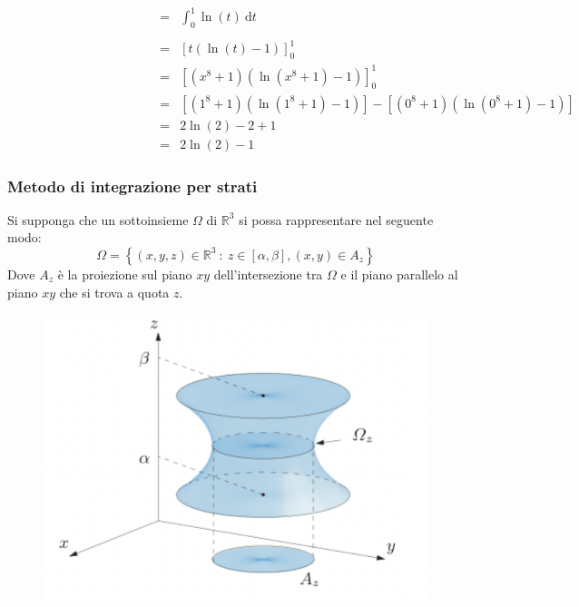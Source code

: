 \documentclass[a4paper]{article}
\begin{document}
	\begin{equation*}
		\begin{array}{rcl}
			\phantom{\displaystyle\iint\limits_{D} 16x^{9}y \cdot \dfrac{1}{x^{2}y^{2} + 1} \:\mathrm{d}x\:\mathrm{d}y}
			&=&
			\displaystyle\int_{0}^{1} \ln\left(t\right) \:\mathrm{d}t \\ [1em]
			&=&
			\left[t\left(\ln\left(t\right) - 1\right)\right]_{0}^{1} \\ [1em]
			&=&
			\left[\left(x^{8}+1\right)\left(\ln\left(x^{8}+1\right) - 1\right)\right]_{0}^{1} \\ [1em]
			&=&
			\left[\left(1^{8}+1\right)\left(\ln\left(1^{8}+1\right) - 1\right)\right] - \left[\left(0^{8}+1\right)\left(\ln\left(0^{8}+1\right) - 1\right)\right] \\ [1em]
			&=& 2 \ln\left(2\right) - 2 + 1 \\ [.5em]
			&=& 2 \ln\left(2\right) - 1
		\end{array}
	\end{equation*}

	\newpage

	\subsubsection{Metodo di integrazione per strati}

	Si supponga che un sottoinsieme $\Omega$ di $\mathbb{R}^{3}$ si possa rappresentare nel seguente modo:
	\begin{equation*}
		\Omega = \left\{\left(x,y,z\right) \in \mathbb{R}^{3} \: : \: z \in \left[\alpha, \beta\right], \left(x,y\right) \in A_{z}\right\}
	\end{equation*}
	Dove $A_{z}$ è la proiezione sul piano $xy$ dell'intersezione tra $\Omega$ e il piano parallelo al piano $xy$ che si trova a quota $z$.
	\begin{figure}[!htp]
		\centering
		\includegraphics[width=.6\textwidth]{img/metodo_di_integrazione_per_strati.png}
	\end{figure}
\end{document}
